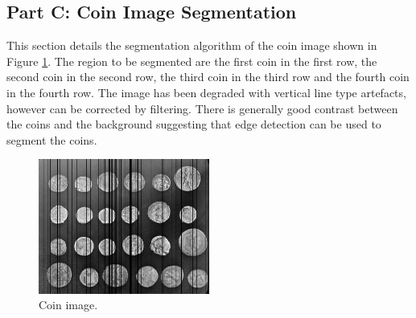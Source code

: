 \documentclass[11pt]{article}
\begin{document}
\subsection{Part C: Coin Image Segmentation}
This section details the segmentation algorithm of the coin image shown in Figure \ref{fig:coins_image}. The region to be segmented are the first coin in the first row, the second coin in the second row, the third coin in the third row and the fourth coin in the fourth row. The image has been degraded with vertical line type artefacts, however can be corrected by filtering. There is generally good contrast between the coins and the background suggesting that edge detection can be used to segment the coins.
\begin{figure}[H] 
    \centering
    \includegraphics[width=0.5\textwidth]{../data/coins.png}
    \caption{Coin image.}
    \label{fig:coins_image}
\end{figure}
\end{document}

